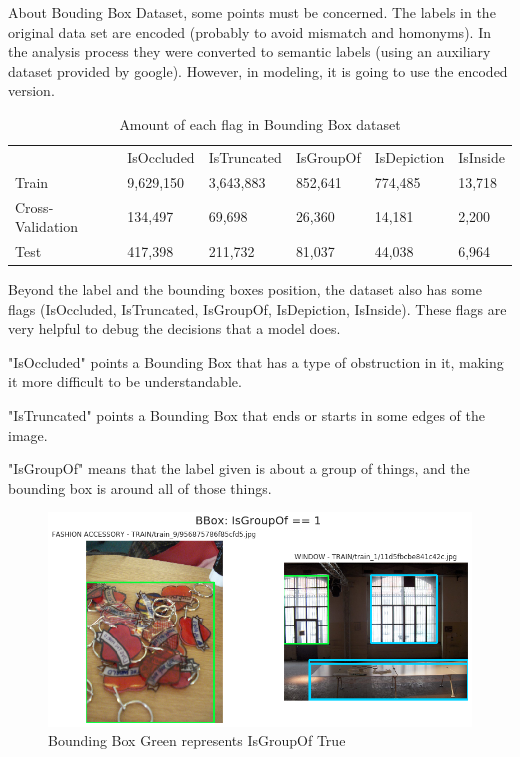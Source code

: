 \documentclass[11pt, a4paper, onecolumn]{article}
\begin{document}
About Bouding Box Dataset, some points must be concerned.
The labels in the original data set are encoded (probably to avoid mismatch and homonyms). In the analysis process they were converted to semantic labels (using an auxiliary dataset provided by google). However, in modeling, it is going to use the encoded version. 

\begin{table}[!ht]
	\footnotesize
	\centering
	\caption{ \footnotesize Amount of each flag in Bounding Box dataset }
	\label{table2}
	\begin{tabular}{llllll}
		& IsOccluded & IsTruncated & IsGroupOf & IsDepiction & IsInside \\
		\rowcolor[HTML]{EFEFEF} 
		Train            & 9,629,150  & 3,643,883   & 852,641   & 774,485     & 13,718   \\
		Cross-Validation & 134,497    & 69,698      & 26,360    & 14,181      & 2,200    \\
		\rowcolor[HTML]{EFEFEF} 
		Test             & 417,398    & 211,732     & 81,037    & 44,038      & 6,964   
	\end{tabular}
\end{table}

Beyond the label and the bounding boxes position, the dataset also has some flags (IsOccluded, IsTruncated, IsGroupOf, IsDepiction, IsInside). These flags are very helpful to debug the decisions that a model does.

"IsOccluded" points a Bounding Box that has a type of obstruction in it, making it more difficult to be understandable.

"IsTruncated" points a Bounding Box that ends or starts in some edges of the image.

"IsGroupOf" means that the label given is about a group of things, and the bounding box is around all of those things.

\begin{figure}[!ht]
	\centering
	\includegraphics[width=1\textwidth]{isgroupof-true.png}
	\caption{\scriptsize Bounding Box Green represents IsGroupOf True }
\end{figure}
\end{document}
